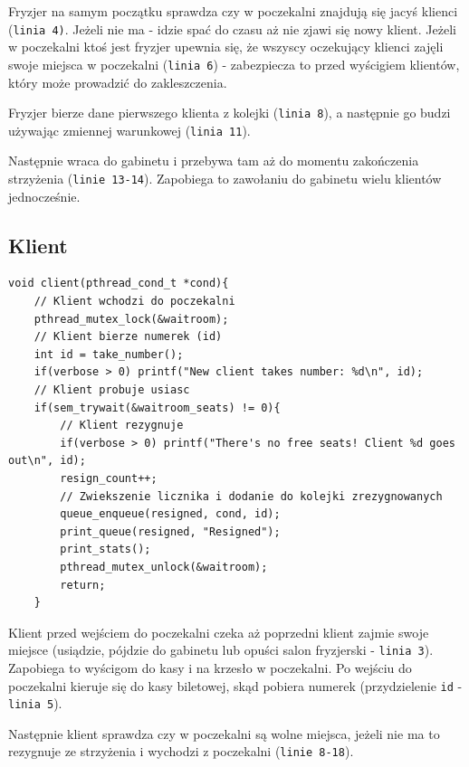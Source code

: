\documentclass[12pt,a4paper]{article}
\begin{document}
	Fryzjer na samym początku sprawdza czy w poczekalni znajdują się
	jacyś klienci (\texttt{linia 4)}. Jeżeli nie ma - idzie spać do 
	czasu aż nie zjawi się nowy klient. Jeżeli w poczekalni ktoś jest 
	fryzjer upewnia się, że wszyscy oczekujący klienci zajęli swoje 
	miejsca w poczekalni (\texttt{linia 6}) - zabezpiecza to przed
	wyścigiem klientów, który może prowadzić do zakleszczenia.
	
	Fryzjer bierze dane pierwszego klienta z kolejki (\texttt{linia 8}),
	a następnie go budzi używając zmiennej warunkowej 
	(\texttt{linia 11}). 
	
	Następnie wraca do gabinetu i przebywa tam aż
	do momentu zakończenia strzyżenia (\texttt{linie 13-14}). Zapobiega
	to zawołaniu do gabinetu wielu klientów jednocześnie.
	
	\subsection{Klient}
	
	\begin{center}
		\begin{minipage}{0.82\linewidth}
\begin{lstlisting}[caption = Funkcja klienta 1/3.]
void client(pthread_cond_t *cond){
    // Klient wchodzi do poczekalni
    pthread_mutex_lock(&waitroom);
    // Klient bierze numerek (id)
    int id = take_number();
    if(verbose > 0) printf("New client takes number: %d\n", id);
    // Klient probuje usiasc
    if(sem_trywait(&waitroom_seats) != 0){
        // Klient rezygnuje
        if(verbose > 0) printf("There's no free seats! Client %d goes out\n", id);
        resign_count++;
        // Zwiekszenie licznika i dodanie do kolejki zrezygnowanych
        queue_enqueue(resigned, cond, id);
        print_queue(resigned, "Resigned");
        print_stats();
        pthread_mutex_unlock(&waitroom);
        return;
    }
\end{lstlisting}
		\end{minipage}
	\end{center}
	
	Klient przed wejściem do poczekalni czeka aż poprzedni klient
	zajmie swoje miejsce (usiądzie, pójdzie do gabinetu lub opuści salon
	fryzjerski - \texttt{linia 3}). Zapobiega to wyścigom do kasy i na
	krzesło w poczekalni. Po wejściu do poczekalni kieruje się do kasy 
	biletowej, skąd pobiera numerek (przydzielenie \texttt{id} -
	\texttt{linia 5}).
	
	Następnie klient sprawdza czy w poczekalni są wolne miejsca, jeżeli
	nie ma to rezygnuje ze strzyżenia i wychodzi z poczekalni
	(\texttt{linie 8-18}).
	
\end{document}
